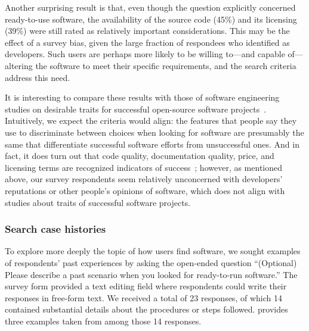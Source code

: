 \documentclass{casicswhitepaper}
\begin{document}
Another surprising result is that, even though the question explicitly concerned ready-to-use software, the availability of the source code (45\%) and its licensing (39\%) were still rated as relatively important considerations. This may be the effect of a survey bias, given the large fraction of respondees who identified as developers. Such users are perhaps more likely to be willing to---and capable of---altering the software to meet their specific requirements, and the search criteria address this need.

It is interesting to compare these results with those of software engineering studies on desirable traits for successful open-source software projects~\cite[e.g.,][]{subramaniam2009determinants, crowston2003defining, crowston2006information, sen2012open, lee2009measuring}.  Intuitively, we expect the criteria would align: the features that people say they use to discriminate between choices when looking for software are presumably the same that differentiate successful software efforts from unsuccessful ones.  And in fact, it does turn out that code quality, documentation quality, price, and licensing terms are recognized indicators of success~\cite{subramaniam2009determinants, crowston2003defining}; however, as mentioned above, our survey respondents seem relatively unconcerned with developers' reputations or other people's opinions of software, which does not align with studies about traits of successful software projects.


\subsubsection{Search case histories}

To explore more deeply the topic of how users find software, we sought examples of respondents' past experiences by asking the open-ended question ``(Optional) Please describe a past scenario when you looked for ready-to-run software.''  The survey form provided a text editing field where respondents could write their responses in free-form text.  We received a total of 23 responses, of which 14 contained substantial details about the procedures or steps followed.   provides three examples taken from among those 14 responses.
\end{document}
